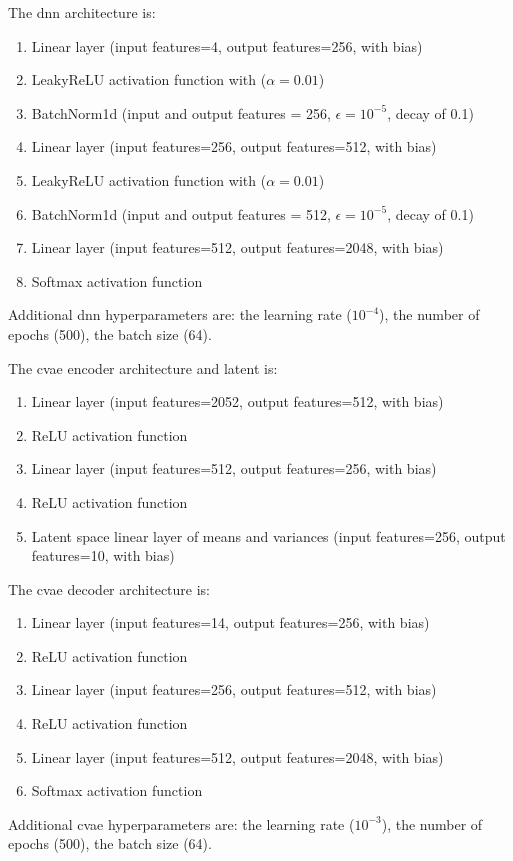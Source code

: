 \documentclass[review]{elsarticle}
\begin{document}
The \gls{dnn} architecture is:
\begin{enumerate}
\item Linear layer (input features=4, output features=256, with bias)
\item LeakyReLU activation function with ($\alpha=0.01$)
\item BatchNorm1d (input and output features = 256, $\epsilon = 10^{-5}$, decay of 0.1)
\item Linear layer (input features=256, output features=512, with bias)
\item LeakyReLU activation function with ($\alpha=0.01$)
\item BatchNorm1d (input and output features = 512, $\epsilon = 10^{-5}$, decay of 0.1)
\item Linear layer (input features=512, output features=2048, with bias)
\item Softmax activation function
\end{enumerate}
Additional \gls{dnn} hyperparameters are: the learning rate
($10^{-4}$), the number of epochs (500), the batch size (64).

The \gls{cvae} encoder architecture and latent is:
\begin{enumerate}
\item Linear layer (input features=2052, output features=512, with bias)
\item ReLU activation function
\item Linear layer (input features=512, output features=256, with bias)
\item ReLU activation function
\item Latent space linear layer of means and variances (input features=256, output features=10, with bias)
\end{enumerate}
The \gls{cvae} decoder architecture is:
\begin{enumerate}
\item Linear layer (input features=14, output features=256, with bias)
\item ReLU activation function
\item Linear layer (input features=256, output features=512, with bias)
\item ReLU activation function
\item Linear layer (input features=512, output features=2048, with bias)
\item Softmax activation function
\end{enumerate}
Additional \gls{cvae} hyperparameters are: the learning rate
($10^{-3}$), the number of epochs (500), the batch size (64).
\end{document}
